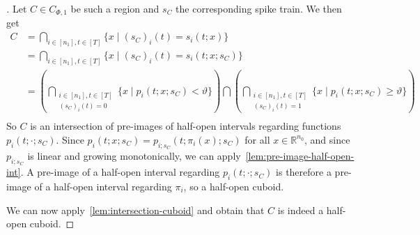 \begin{proof}[]
  Let \(C∈C_{Φ,1}\) be such a region and \(s_C\) the corresponding spike train. We then get
  \begin{align*}
    C&=\bigcap_{i∈[n_1],t∈[T]}\{x\mid (s_C)_i(t) =s_i(t;x)\} \\
     &=\bigcap_{i∈[n_1],t∈[T]}\{x\mid (s_C)_i(t) =s_i(t;x;s_C)\} \\
     &= \left(\bigcap_{\substack{i∈[n_1],t∈[T] \\ (s_C)_i(t)=0}}\{x\mid p_i(t;x;s_C)<ϑ\}\right) \bigcap \left(\bigcap_{\substack{i∈[n_1],t∈[T] \\ (s_C)_i(t)=1}}\{x\mid p_i(t;x;s_C)≥ϑ\}\right) \\
  \end{align*}
  So \(C\) is an intersection of pre-images of half-open intervals regarding functions \(p_i(t;·;s_C)\). Since \(p_i(t;x;s_C)=p_{i;s_C}(t;π_i(x);s_C)\) for all \(x∈ℝ^{n_0}\), and since \(p_{i;s_C}\) is linear and growing monotonically, we can apply~\autoref{lem:pre-image-half-open-int}. A pre-image of a half-open interval regarding \(p_i(t;·;s_C)\) is therefore a pre-image of a half-open interval regarding \(π_i\), so a half-open cuboid.

  We can now apply~\autoref{lem:intersection-cuboid} and obtain that \(C\) is indeed a half-open cuboid.




\end{proof}

